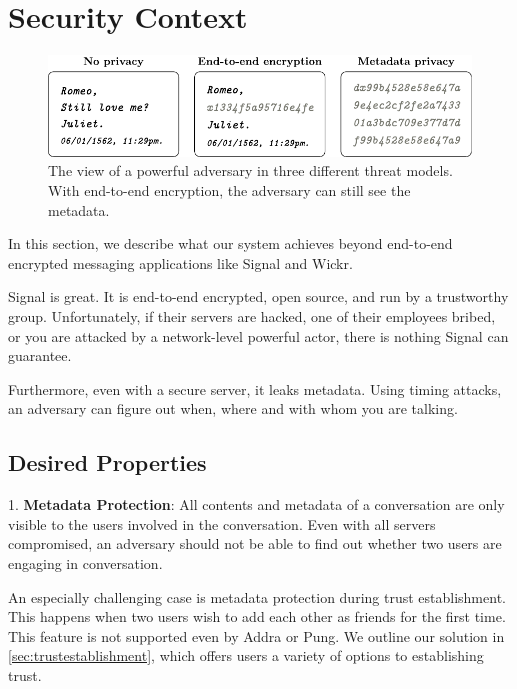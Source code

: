 \section{Security Context}
\label{sec:securitycontext}

\begin{figure}
    \centering
        \includegraphics[width=\textwidth]{metadata-privacy.pdf}
\caption{The view of a powerful adversary in three different threat models. With end-to-end encryption, the adversary can still see the metadata.}
\label{fig:metadataprivacy}
\end{figure}



In this section, we describe what our system achieves beyond end-to-end encrypted messaging applications like Signal and Wickr.

Signal is great. It is end-to-end encrypted, open source, and run by a trustworthy group. Unfortunately, if their servers are hacked, one of their employees bribed, or you are attacked by a network-level powerful actor, there is nothing Signal can guarantee. 

Furthermore, even with a secure server, it leaks metadata.  Using timing attacks, an adversary can figure out when, where and with whom you are talking. 

\subsection{Desired Properties}

1. \textbf{Metadata Protection}: All contents and metadata of a conversation are only visible to the users involved in the conversation. Even with all servers compromised, an adversary should not be able to find out whether two users are engaging in conversation.

An especially challenging case is metadata protection during trust establishment. This happens when two users wish to add each other as friends for the first time. This feature is not supported even by Addra or Pung. We outline our solution in \cref{sec:trustestablishment}, which offers users a variety of options to establishing trust.

